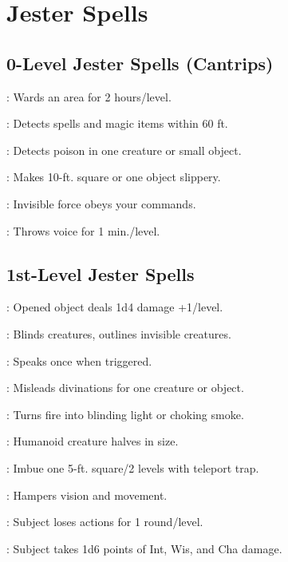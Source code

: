 \section{Jester Spells}

\begin{multicols}{2}

\subsection{0-Level Jester Spells (Cantrips)}
\begin{description*}
\item[\linkspell{Alarm}:] Wards an area for 2 hours/level.
\item[\linkspell{Detect Magic}:] Detects spells and magic items within 60 ft.
\item[\linkspell{Detect Poison}:] Detects poison in one creature or small object.
\item[\linkspell{Grease}:] Makes 10-ft. square or one object slippery.
\item[\linkspell{Unseen Servant}:] Invisible force obeys your commands.
\item[\linkspell{Ventriloquism}:] Throws voice for 1 min./level.
\end{description*}

\subsection{1st-Level Jester Spells}
\begin{description*}
\item[\linkspell{Fire Trap}:] Opened object deals 1d4 damage +1/level.
\item[\linkspell{Glitterdust}:] Blinds creatures, outlines invisible creatures.
\item[\linkspell{Magic Mouth}:] Speaks once when triggered.
\item[\linkspell{Misdirection}:] Misleads divinations for one creature or object.
\item[\linkspell{Pyrotechnics}:] Turns fire into blinding light or choking smoke.
\item[\linkspell{Reduce Person}:] Humanoid creature halves in size.
\item[\linkspell{Scattering Trap}:] Imbue one 5-ft. square/2 levels with teleport trap.
\item[\linkspell{Sleet Storm}:] Hampers vision and movement.
\item[\linkspell{Hideous Laughter}:] Subject loses actions for 1 round/level.
\item[\linkspell{Touch of Idiocy}:] Subject takes 1d6 points of Int, Wis, and Cha damage.
\end{description*}


\end{multicols}
